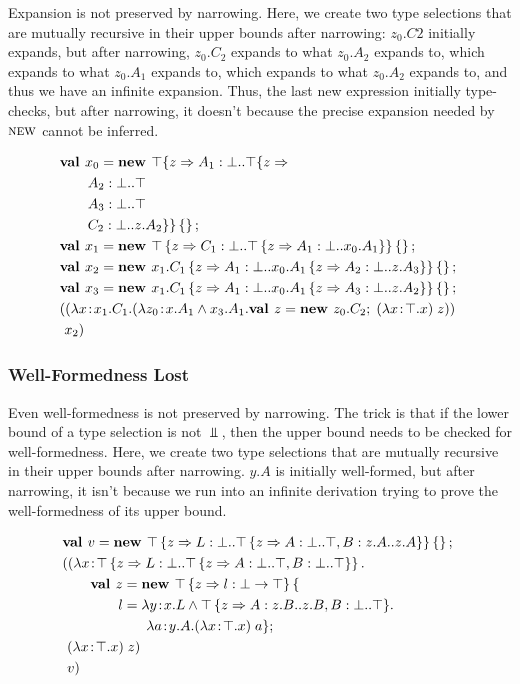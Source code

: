 \documentclass[preprint]{sigplanconf}
\begin{document}
Expansion is not preserved by narrowing. Here, we create two type
selections that are mutually recursive in their upper bounds after
narrowing: $z_0.C2$ initially expands, but after narrowing, $z_0.C_2$
expands to what $z_0.A_2$ expands to, which expands to what $z_0.A_1$
expands to, which expands to what $z_0.A_2$ expands to, and thus we
have an infinite expansion. Thus, the last new expression initially
type-checks, but after narrowing, it doesn't because the precise
expansion needed by $\textsc{new}$ cannot be inferred.

\begin{align*}
&\textbf{val }x_0 = \textbf{new }\top \{z \Rightarrow  A_1 : \bot..\top \{z \Rightarrow \\
&\quad\quad A_2 : \bot..\top\\
&\quad\quad A_3 : \bot..\top\\
&\quad\quad C_2 : \bot..z.A_2 \} \}\left\{\right\} ;\;\\&
\textbf{val }x_1 = \textbf{new }\top \left\{z \Rightarrow C_1 : \bot..\top \left\{z \Rightarrow A_1 : \bot..x_0.A_1 \right\} \right\}\left\{\right\} ;\;\\&
\textbf{val }x_2 = \textbf{new }{x_1.C_1} \left\{z \Rightarrow A_1 : \bot..{x_0.A_1} \left\{z \Rightarrow A_2 : \bot..z.A_3 \right\} \right\}\left\{\right\} ;\;\\&
\textbf{val }x_3 = \textbf{new }{x_1.C_1} \left\{z \Rightarrow A_1 : \bot..{x_0.A_1} \left\{z \Rightarrow A_3 : \bot..z.A_2 \right\} \right\}\left\{\right\} ;\;\\&
((\lambda x\!:\!x_1.C_1.(\lambda z_0\!:\!x.A_1 \wedge x_3.A_1.\textbf{val }z = \textbf{new }z_0.C_2 ;\; (\lambda x\!:\!\top.x)\;z))\;\\&\ x_2)
\end{align*}

\subsubsection{Well-Formedness Lost}\label{narrowing_wf}

Even well-formedness is not preserved by narrowing. The trick is that
if the lower bound of a type selection is not $\Bot$, then the upper
bound needs to be checked for well-formedness. Here, we create two
type selections that are mutually recursive in their upper bounds
after narrowing. $y.A$ is initially well-formed, but after narrowing,
it isn't because we run into an infinite derivation trying to prove
the well-formedness of its upper bound.

\begin{align*}
&\mlnew v {\Top \refine z {\Ldecl L \Bot {\Top \refine z {\Ldecl A \Bot \Top, \Ldecl B {z.A} {z.A}}}} \ldefs{}}{
\mlapp {\abs x {\Top \refine z {\Ldecl L \Bot {\Top \refine z {\Ldecl A \Bot \Top, \Ldecl B \Bot \Top}}}} {\\&\gap
\mlnew z {\Top \refine z {\ldecl l {\Bot \tfun \Top}}\mlldefs{\\&\gap\gap l = \abs y {x.L \tand {\Top \refine z {\Ldecl A {z.B} {z.B}, \Ldecl B \Bot \Top}}} {\\&\gap\gap\gap\abs a {y.A} {\app {(\abs x \Top x)} a}}}}{
\ \app {(\abs x \Top x)} z
}}}{\ v}}
\end{align*}
\end{document}
